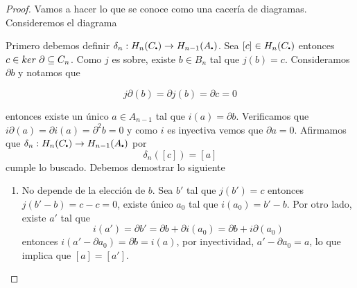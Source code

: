 \documentclass[aop]{imsart2}
\theoremstyle{plain}
\theoremstyle{remark}
\newcommand{\kr}[1]{ker\hspace{1mm}#1}
\newcommand\sbullet[1][.5]{\mathbin{\vcenter{\hbox{\scalebox{#1}{$\bullet$}}}}}
\begin{document}
\begin{proof}
    Vamos a hacer lo que se conoce como una cacería de diagramas. Consideremos el diagrama

    \vspace{2mm}
    \centerline{
    }
    \vspace{2mm}
    \noindent Primero debemos definir $\delta_{n}:H_{n}(C_{\sbullet})\to H_{n-1}(A_{\sbullet})$.
    Sea $[c]\in H_{n}(C_{\sbullet})$ entonces $c\in\kr{\partial}\subseteq C_{n}$. Como $j$ es 
    sobre, existe $b\in B_{n}$ tal que $j(b)=c$. Consideramos $\partial b$ y notamos que
    
    \begin{equation*}
        j\partial(b)=\partial j(b)=\partial c=0
    \end{equation*}
    
    \noindent entonces existe un único $a\in A_{n-1}$ tal que $i(a)=\partial b$. Verificamos que 
    $i\partial(a)=\partial i(a)=\partial^{2}b=0$ y como $i$ es inyectiva vemos que 
    $\partial a=0$. Afirmamos que $\delta_{n}:H_{n}(C_{\sbullet})\to H_{n-1}(A_{\sbullet})$ por
    \begin{equation*}
        \delta_{n}([c])=[a]
    \end{equation*}
    cumple lo buscado. Debemos demostrar lo siguiente
    \begin{enumerate}
        \item No depende de la elección de $b$. Sea $b'$ tal que $j(b')=c$ entonces 
        $j(b'-b)=c-c=0$, existe único $a_{0}$ tal que $i(a_{0})=b'-b$. Por otro lado, existe $a'$
        tal que
        \begin{equation*}
            i(a')=\partial b'=\partial b+\partial i(a_{0})=\partial b+i\partial(a_{0})
        \end{equation*}
        entonces $i(a'-\partial a_{0})=\partial b=i(a)$, por inyectividad, $a'-\partial a_{0}=a$,
        lo que implica que $[a]=[a']$.


\end{enumerate}
\end{proof}
\end{document}
